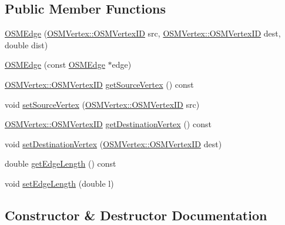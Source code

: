 \subsection*{Public Member Functions}
\begin{DoxyCompactItemize}
\item 
\hyperlink{classbridges_1_1dataset_1_1_o_s_m_edge_a4b638a47d5cf8f1248d318b48bbbd5a0}{O\+S\+M\+Edge} (\hyperlink{classbridges_1_1dataset_1_1_o_s_m_vertex_ad166f13b0aefbdc05a273546f2a3bb96}{O\+S\+M\+Vertex\+::\+O\+S\+M\+Vertex\+ID} src, \hyperlink{classbridges_1_1dataset_1_1_o_s_m_vertex_ad166f13b0aefbdc05a273546f2a3bb96}{O\+S\+M\+Vertex\+::\+O\+S\+M\+Vertex\+ID} dest, double dist)
\item 
\hyperlink{classbridges_1_1dataset_1_1_o_s_m_edge_a8e412f87ed35e5667987de457e5609b6}{O\+S\+M\+Edge} (const \hyperlink{classbridges_1_1dataset_1_1_o_s_m_edge}{O\+S\+M\+Edge} $\ast$edge)
\item 
\hyperlink{classbridges_1_1dataset_1_1_o_s_m_vertex_ad166f13b0aefbdc05a273546f2a3bb96}{O\+S\+M\+Vertex\+::\+O\+S\+M\+Vertex\+ID} \hyperlink{classbridges_1_1dataset_1_1_o_s_m_edge_abe843416c79a4765a7ecb52d02283310}{get\+Source\+Vertex} () const
\item 
void \hyperlink{classbridges_1_1dataset_1_1_o_s_m_edge_ac34db39ff9ef47f69042e9d6ab577112}{set\+Source\+Vertex} (\hyperlink{classbridges_1_1dataset_1_1_o_s_m_vertex_ad166f13b0aefbdc05a273546f2a3bb96}{O\+S\+M\+Vertex\+::\+O\+S\+M\+Vertex\+ID} src)
\item 
\hyperlink{classbridges_1_1dataset_1_1_o_s_m_vertex_ad166f13b0aefbdc05a273546f2a3bb96}{O\+S\+M\+Vertex\+::\+O\+S\+M\+Vertex\+ID} \hyperlink{classbridges_1_1dataset_1_1_o_s_m_edge_ae9b23f06502688abd4ebc7b03abef7bc}{get\+Destination\+Vertex} () const
\item 
void \hyperlink{classbridges_1_1dataset_1_1_o_s_m_edge_a71868ae7357fc2aaa576e6befbbb0112}{set\+Destination\+Vertex} (\hyperlink{classbridges_1_1dataset_1_1_o_s_m_vertex_ad166f13b0aefbdc05a273546f2a3bb96}{O\+S\+M\+Vertex\+::\+O\+S\+M\+Vertex\+ID} dest)
\item 
double \hyperlink{classbridges_1_1dataset_1_1_o_s_m_edge_a4317cc9c09aa9a5108031185047cb399}{get\+Edge\+Length} () const
\item 
void \hyperlink{classbridges_1_1dataset_1_1_o_s_m_edge_a469d98f2239f245b43d3475cbc8c0e74}{set\+Edge\+Length} (double l)
\end{DoxyCompactItemize}


\subsection{Constructor \& Destructor Documentation}
\mbox{\label{classbridges_1_1dataset_1_1_o_s_m_edge_a4b638a47d5cf8f1248d318b48bbbd5a0}} 

